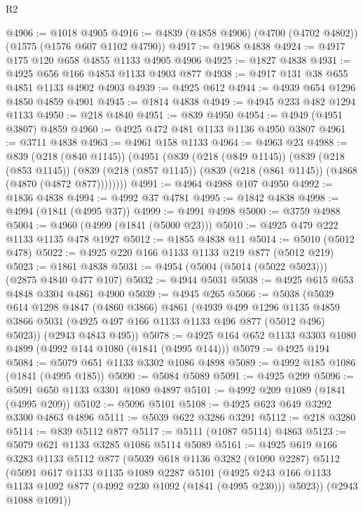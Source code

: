 \begin{lexlean}{R2}
\begin{coremodule}
@4906 := @1018 @4905
@4916 := @4839 (@4858 @4906) (@4700 (@4702 @4802)) (@1575 (@1576 @607 @1102 @4790))
@4917 := @1968 @4838
@4924 := @4917 @175 @120 @658 @4855 @1133 @4905 @4906
@4925 := @1827 @4838
@4931 := @4925 @656 @166 @4853 @1133 @4903 @877
@4938 := @4917 @131 @38 @655 @4851 @1133 @4902 @4903
@4939 := @4925 @612
@4944 := @4939 @654 @1296 @4850 @4859 @4901
@4945 := @1814 @4838
@4949 := @4945 @233 @482 @1294 @1133
@4950 := @218 @4840
@4951 := @839 @4950
@4954 := @4949 (@4951 @3807) @4859
@4960 := @4925 @472 @481 @1133 @1136 @4950 @3807
@4961 := @3711 @4838
@4963 := @4961 @158 @1133
@4964 := @4963 @23
@4988 := @839
    (@218 (@840 @1145))
    (@4951
      (@839
        (@218 (@849 @1145))
        (@839
          (@218 (@853 @1145))
          (@839 (@218 (@857 @1145)) (@839 (@218 (@861 @1145)) (@4868 (@4870 (@4872 @877))))))))
@4991 := @4964 @4988 @107 @4950
@4992 := @1836 @4838
@4994 := @4992 @37 @4781
@4995 := @1842 @4838
@4998 := @4994 (@1841 (@4995 @37))
@4999 := @4991 @4998
@5000 := @3759 @4988
@5004 := @4960 (@4999 (@1841 (@5000 @23)))
@5010 := @4925 @479 @222 @1133 @1135 @478 @1927
@5012 := @1855 @4838 @11
@5014 := @5010 (@5012 @478)
@5022 := @4925 @220 @166 @1133 @1133 @219 @877 (@5012 @219)
@5023 := @1861 @4838
@5031 := @4954 (@5004 (@5014 (@5022 @5023))) (@2875 @4840 @477 @107)
@5032 := @4944 @5031
@5038 := @4925 @615 @653 @4848 @3304 @4861 @4900
@5039 := @4945 @265
@5066 := @5038
    (@5039
      @614
      @1298
      @4847
      (@4860 @3866)
      @4861
      (@4939
        @499
        @1296
        @1135
        @4859
        @3866
        @5031
        (@4925 @497 @166 @1133 @1133 @496 @877 (@5012 @496) @5023))
      (@2943 @4843 @495))
@5078 := @4925 @164 @652 @1133 @3303 @1080 @4899 (@4992 @144 @1080 (@1841 (@4995 @144)))
@5079 := @4925 @194
@5084 := @5079 @651 @1133 @3302 @1086 @4898
@5089 := @4992 @185 @1086 (@1841 (@4995 @185))
@5090 := @5084 @5089
@5091 := @4925 @299
@5096 := @5091 @650 @1133 @3301 @1089 @4897
@5101 := @4992 @209 @1089 (@1841 (@4995 @209))
@5102 := @5096 @5101
@5108 := @4925 @623 @649 @3292 @3300 @4863 @4896
@5111 := @5039 @622 @3286 @3291
@5112 := @218 @3280
@5114 := @839 @5112 @877
@5117 := @5111 (@1087 @5114) @4863
@5123 := @5079 @621 @1133 @3285 @1086 @5114 @5089
@5161 := @4925
    @619
    @166
    @3283
    @1133
    @5112
    @877
    (@5039
      @618
      @1136
      @3282
      (@1090 @2287)
      @5112
      (@5091
        @617
        @1133
        @1135
        @1089
        @2287
        @5101
        (@4925 @243 @166 @1133 @1133 @1092 @877 (@4992 @230 @1092 (@1841 (@4995 @230))) @5023))
      (@2943 @1088 @1091))

\end{coremodule}
\end{lexlean}
